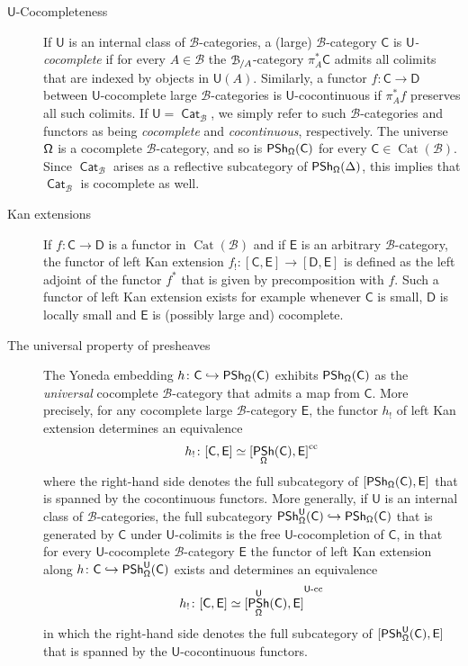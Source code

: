 \documentclass[reqno]{amsart}
\numberwithin{equation}{subsection}
\theoremstyle{plain}
\theoremstyle{definition}
\let\scr=\mathcal
\let\into=\hookrightarrow
\def\BB{\scr B}
\DeclareMathOperator{\IPSh}{\mathsf{PSh}}
\DeclareMathOperator{\Cat}{Cat}
\DeclareMathOperator{\ICat}{\mathsf{Cat}}
\newcommand{\Over}[2]{#1_{\hspace{-1pt}/#2}}
\newcommand{\I}[1]{\mathsf{#1}}
\newcommand{\iFun}[2]{{[#1,#2]}}
\newcommand{\cc}{\text{\normalfont{cc}}}
\newcommand{\cocont}[1]{{#1\text{\normalfont{-cc}}}}
\begin{document}
\begin{description}
    \item[$\I{U}$-Cocompleteness]
    If $\I{U}$ is an internal class of $\BB$-categories, a (large) $\BB$-category $\I{C}$ is \emph{$\I{U}$-cocomplete} if for every $A\in\BB$ the $\Over{\BB}{A}$-category $\pi_A^\ast\I{C}$ admits all colimits that are indexed by objects in $\I{U}(A)$. Similarly, a functor $f\colon\I{C}\to\I{D}$ between $\I{U}$-cocomplete large $\BB$-categories is $\I{U}$-cocontinuous if $\pi_A^\ast f$ preserves all such colimits. If $\I{U}=\ICat_{\BB}$, we simply refer to such $\BB$-categories and functors as being \emph{cocomplete} and \emph{cocontinuous}, respectively. The universe $\Univ$ is a cocomplete $\BB$-category, and so is $\IPSh_{\Univ}(\I{C})$ for every $\I{C}\in\Cat(\BB)$. Since $\ICat_{\BB}$ arises as a reflective subcategory of $\IPSh_{\Univ}(\Delta)$, this implies that $\ICat_{\BB}$ is cocomplete as well.
    
    \item[Kan extensions]
    If $f\colon\I{C}\to\I{D}$ is a functor in $\Cat(\BB)$ and if $\I{E}$ is an arbitrary $\BB$-category, the functor of left Kan extension $f_!\colon\iFun{\I{C}}{\I{E}}\to\iFun{\I{D}}{\I{E}}$ is defined as the left adjoint of the functor $f^\ast$ that is given by precomposition with $f$. Such a functor of left Kan extension exists for example whenever $\I{C}$ is small, $\I{D}$ is locally small and $\I{E}$ is (possibly large and) cocomplete.
    
    \item[The universal property of presheaves]
    The Yoneda embedding $h\colon\I{C}\into\IPSh_{\Univ}(\I{C})$ exhibits $\IPSh_{\Univ}(\I{C})$ as the \emph{universal} cocomplete $\BB$-category that admits a map from $\I{C}$. More precisely, for any cocomplete large $\BB$-category $\I{E}$, the functor $h_!$ of left Kan extension determines an equivalence
    \begin{equation*}
    h_!\colon\iFun{\I{C}}{\I{E}}\simeq\iFun{\IPSh_{\Univ}(\I{C})}{\I{E}}^{\cc}
    \end{equation*}
    where the right-hand side denotes the full subcategory of $\iFun{\IPSh_{\Univ}(\I{C})}{\I{E}}$ that is spanned by the cocontinuous functors. More generally, if $\I{U}$ is an internal class of $\BB$-categories, the full subcategory $\IPSh_{\Univ}^{\I{U}}(\I{C})\into\IPSh_{\Univ}(\I{C})$ that is generated by $\I{C}$ under $\I{U}$-colimits is the free $\I{U}$-cocompletion of $\I{C}$, in that for every $\I{U}$-cocomplete $\BB$-category $\I{E}$ the functor of left Kan extension along $h\colon\I{C}\into\IPSh_{\Univ}^{\I{U}}(\I{C})$ exists and determines an equivalence
    \begin{equation*}
        h_!\colon\iFun{\I{C}}{\I{E}}\simeq\iFun{\IPSh_{\Univ}^{\I{U}}(\I{C})}{\I{E}}^{\cocont{\I{U}}}
     \end{equation*}
     in which the right-hand side denotes the full subcategory of $\iFun{\IPSh_{\Univ}^{\I{U}}(\I{C})}{\I{E}}$ that is spanned by the $\I{U}$-cocontinuous functors.
    
\end{description}
\end{document}
